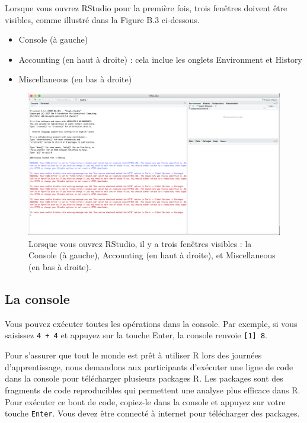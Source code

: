 \documentclass[
  12pt,
]{book}
\providecommand{\tightlist}{%
  \setlength{\itemsep}{0pt}\setlength{\parskip}{0pt}}
\begin{document}
Lorsque vous ouvrez RStudio pour la première fois, trois fenêtres doivent être visibles, comme illustré dans la Figure B.3 ci-dessous.

\begin{itemize}
\tightlist
\item
  Console (à gauche)
\item
  Accounting (en haut à droite) : cela inclue les onglets Environment et History
\item
  Miscellaneous (en bas à droite)
\end{itemize}

\begin{figure}
\includegraphics[width=0.8\linewidth]{Images/rstudio_intro} \caption{Lorsque vous ouvrez RStudio, il y a trois fenêtres visibles : la Console (à gauche), Accounting (en haut à droite), et Miscellaneous (en bas à droite).}\label{fig:rstudiointro}
\end{figure}

\hypertarget{la-console}{%
\subsection{La console}\label{la-console}}

Vous pouvez exécuter toutes les opérations dans la console. Par exemple, si vous saisissez \texttt{4\ +\ 4} et appuyez sur la touche Enter, la console renvoie \texttt{{[}1{]}\ 8}.

Pour s'assurer que tout le monde est prêt à utiliser R lors des journées d'apprentissage, nous demandons aux participants d'exécuter une ligne de code dans la console pour télécharger plusieurs packages R. Les packages sont des fragments de code reproducibles qui permettent une analyse plus efficace dans R. Pour exécuter ce bout de code, copiez-le dans la console et appuyez sur votre touche \texttt{Enter}. Vous devez être connecté à internet pour télécharger des packages.
\end{document}
